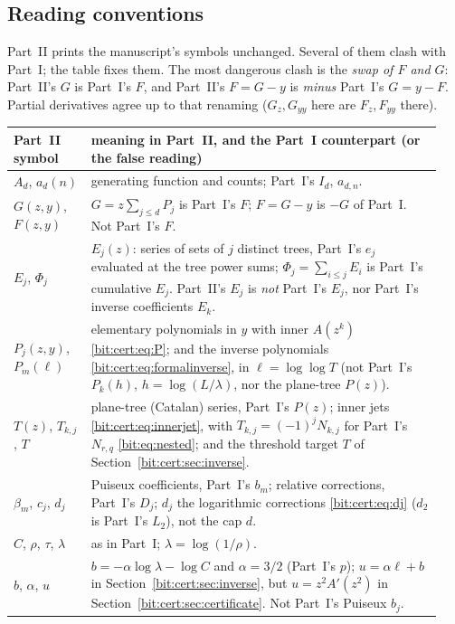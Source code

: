 \documentclass[11pt]{article}
\theoremstyle{definition}\newtheorem{definition}[theorem]{Definition}
\theoremstyle{remark}\newtheorem{remark}[theorem]{Remark}
\begin{document}
\subsection{Reading conventions}\label{bit:cert:sec:notation}
Part~II prints the manuscript's symbols unchanged. Several of them clash with
Part~I; the table fixes them. The most dangerous clash is the \emph{swap of
$F$ and $G$}: Part~II's $G$ is Part~I's $F$, and Part~II's $F=G-y$ is
\emph{minus} Part~I's $G=y-F$. Partial derivatives agree up to that renaming
($G_z,G_{yy}$ here are $F_z,F_{yy}$ there).
\begin{center}\footnotesize
\begin{tabular}{@{}>{\raggedright\arraybackslash}p{0.17\linewidth}>{\raggedright\arraybackslash}p{0.77\linewidth}@{}}
\toprule
Part~II symbol & meaning in Part~II, and the Part~I counterpart (or the false reading)\\
\midrule
$A_d$, $a_d(n)$ & generating function and counts; Part~I's $I_d$, $a_{d,n}$.\\
$G(z,y)$, $F(z,y)$ & $G=z\sum_{j\le d}P_j$ is Part~I's $F$; $F=G-y$ is $-G$ of Part~I. Not Part~I's $F$.\\
$E_j$, $\Phi_j$ & $E_j(z)$: series of sets of $j$ distinct trees, Part~I's $e_j$ evaluated at the tree power sums; $\Phi_j=\sum_{i\le j}E_i$ is Part~I's cumulative $E_j$. Part~II's $E_j$ is \emph{not} Part~I's $E_j$, nor Part~I's inverse coefficients $E_k$.\\
$P_j(z,y)$, $P_m(\ell)$ & elementary polynomials in $y$ with inner $A(z^k)$ \eqref{bit:cert:eq:P}; and the inverse polynomials \eqref{bit:cert:eq:formalinverse}, in $\ell=\log\log T$ (not Part~I's $P_k(h)$, $h=\log(L/\lambda)$, nor the plane-tree $P(z)$).\\
$T(z)$, $T_{k,j}$, $T$ & plane-tree (Catalan) series, Part~I's $P(z)$; inner jets \eqref{bit:cert:eq:innerjet}, with $T_{k,j}=(-1)^jN_{k,j}$ for Part~I's $N_{r,q}$ \eqref{bit:eq:nested}; and the threshold target $T$ of Section~\ref{bit:cert:sec:inverse}.\\
$\beta_m$, $c_j$, $d_j$ & Puiseux coefficients, Part~I's $b_m$; relative corrections, Part~I's $D_j$; $d_j$ the logarithmic corrections \eqref{bit:cert:eq:dj} ($d_2$ is Part~I's $L_2$), not the cap $d$.\\
$C$, $\rho$, $\tau$, $\lambda$ & as in Part~I; $\lambda=\log(1/\rho)$.\\
$b$, $\alpha$, $u$ & $b=-\alpha\log\lambda-\log C$ and $\alpha=3/2$ (Part~I's $p$); $u=\alpha\ell+b$ in Section~\ref{bit:cert:sec:inverse}, but $u=z^2A'(z^2)$ in Section~\ref{bit:cert:sec:certificate}. Not Part~I's Puiseux $b_j$.\\

\end{tabular}
\end{center}
\end{document}
